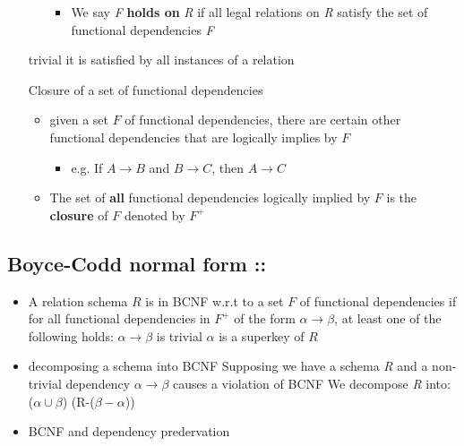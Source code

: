 \documentclass[11pt]{article}
\begin{document}
\begin{itemize}
\begin{itemize}
\begin{itemize}
\item We say \emph{F} \textbf{holds on} \emph{R} if all legal relations on \emph{R} satisfy the set of functional dependencies
\emph{F}
\end{itemize}
\end{itemize}
\item[{trivial}] it is satisfied by all instances of a relation
\item[{Closure of a set of functional dependencies}] \begin{itemize}
\item given a set $F$ of functional dependencies, there are certain other
functional dependencies that are logically implies by $F$
\begin{itemize}
\item e.g. If $A\to B$ and $B\to C$, then $A\to C$
\end{itemize}
\item The set of \textbf{all} functional dependencies logically implied by $F$ is the \textbf{closure} of $F$
       denoted by $F^+$
\end{itemize}
\end{itemize}
\subsection{Boyce-Codd normal form ::}
\label{sec-13-3}
\begin{itemize}
\item A relation schema $R$ is in BCNF w.r.t to a set $F$ of functional
dependencies if for all functional dependencies in $F^+$ of the form
$\alpha\to\beta$, at least one of the following holds:
$\alpha\to\beta$ is trivial
$\alpha$ is a superkey of $R$
\item decomposing a schema into BCNF
Supposing we have a schema \emph{R} and a non-trivial dependency $\alpha\to\beta$ causes
a violation of BCNF
We decompose \emph{R} into:
($\alpha\cup\beta$)
(R-($\beta-\alpha$))
\item BCNF and dependency predervation
\end{itemize}
\end{document}
